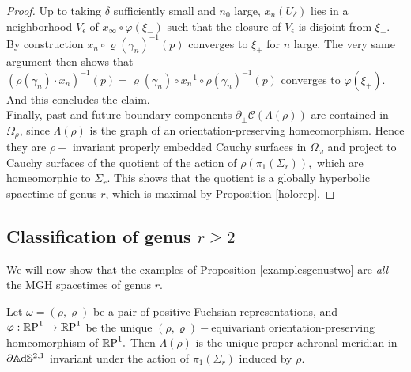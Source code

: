 \begin{proof}
    Up to taking $\delta$ sufficiently small and $n_0$ large, $x_n(U_\delta)$ lies in a neighborhood $V_\epsilon$ of $x_\infty\circ\varphi(\xi_-)$ such that the closure of $V_\epsilon$ is disjoint from $\xi_-$. By construction $x_n\circ \varrho(\gamma_n)^{-1}(p)$ converges to $\xi_+$ for $n$ large. The very same argument then shows that $(\rho(\gamma_n)\cdot x_n)^{-1}(p)=\varrho(\gamma_n)\circ x_n^{-1}\circ\rho(\gamma_n)^{-1}(p)$ converges to $\varphi(\xi_+)$. And this concludes the claim. \\
    Finally, past and future boundary components $\partial_\pm\mathcal{C}(\Lambda(\rho))$ are contained in $\Omega_{\rho}$, since $\Lambda(\rho)$ is the graph of an orientation-preserving homeomorphism. Hence they are $\rho-$ invariant properly embedded Cauchy surfaces in $\Omega_\omega$ and project to Cauchy surfaces of the quotient of the action of $\rho(\pi_1(\Sigma_r)),$ which are homeomorphic to $\Sigma_r$. This shows that the quotient is a globally hyperbolic spacetime of genus $r$, which is maximal by Proposition \ref{holorep}.
\end{proof}

\subsection{Classification of genus $r\geq 2$} We will now show that the examples of Proposition \ref{examplesgenustwo} are \textit{all} the MGH spacetimes of genus $r$. 

\begin{lemma}
    Let $\omega=(\rho,\varrho)$ be a pair of positive Fuchsian representations, and $\varphi:\mathbb{R}\text{P}^1\to\mathbb{R}\text{P}^1$ be the unique $(\rho,\varrho)-$equivariant orientation-preserving homeomorphism of $\mathbb{R}\text{P}^1.$ Then $\Lambda(\rho)$ is the unique proper achronal meridian in $\partial\mathbb{A}\mathrm{d}\mathbb{S}^{2,1}$ invariant under the action of $\pi_1(\Sigma_r)$ induced by $\rho.$
\end{lemma}

